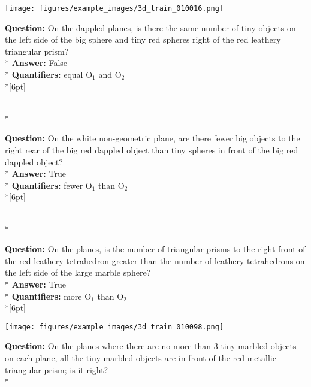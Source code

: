 \begin{figure*}
  \begin{minipage}{0.48\textwidth}
    \texttt{[image: figures/example\_images/3d\_train\_010016.png]}
    \begin{minipage}[t][2.2cm][t]{1\textwidth}
      \footnotesize
      \textbf{Question:} On the dappled planes, is there the same number of tiny objects on the left side of the big sphere and tiny red spheres right of the red leathery triangular prism? \\*
      \textbf{Answer:}  False \\*
      \textbf{Quantifiers:} equal O$_1$ and O$_2$ \\*[6pt]
    \end{minipage}\\*
    \begin{minipage}[t][2.2cm][t]{1\textwidth}
      \footnotesize
      \textbf{Question:} On the white non-geometric plane, are there fewer big objects to the right rear of the big red dappled object than tiny spheres in front of the big red dappled object? \\*
      \textbf{Answer:} True \\*
      \textbf{Quantifiers:} fewer O$_1$ than O$_2$ \\*[6pt]
    \end{minipage}\\*
    \begin{minipage}[t][2.2cm][t]{1\textwidth}
      \footnotesize
      \textbf{Question:} On the planes, is the number of triangular prisms to the right front of the red leathery tetrahedron greater than the number of leathery tetrahedrons on the left side of the large marble sphere? \\*
      \textbf{Answer:} True \\*
      \textbf{Quantifiers:} more O$_1$ than O$_2$  \\*[6pt]
    \end{minipage}
  \end{minipage}
  \hspace{3.5mm}
  \begin{minipage}{0.48\textwidth}
    \texttt{[image: figures/example\_images/3d\_train\_010098.png]}
    \begin{minipage}[t][2.2cm][t]{1\textwidth}
      \footnotesize
      \textbf{Question:} On the planes where there are no more than 3 tiny marbled objects on each plane, all the tiny marbled objects are in front of the red metallic triangular prism; is it right? \\*

\end{minipage}
\end{minipage}
\end{figure*}
